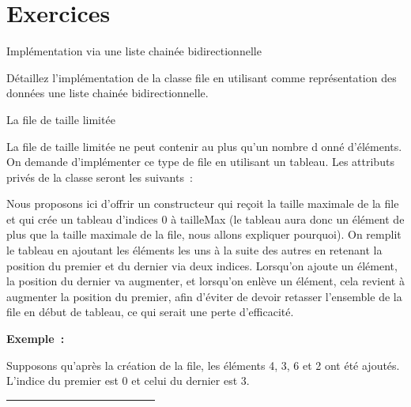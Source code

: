 	
\section{Exercices}

	\begin{Exercice}{Implémentation via une liste chainée bidirectionnelle}
		
		Détaillez l'implémentation de la classe file en utilisant 
		comme représentation des données une liste chainée bidirectionnelle.
	\end{Exercice}

	\begin{Exercice}{La file de taille limitée}
		
		La file de taille limitée ne peut contenir au plus qu'un nombre d
		onné d'éléments. On demande d'implémenter ce type de
		file en utilisant un tableau. Les attributs privés de la 
		classe seront les suivants~:

				
		Nous proposons ici d'offrir un constructeur qui reçoit la 
		taille maximale de la file et qui crée un tableau d'indices 0
		à tailleMax (le tableau aura donc un élément de plus que 
		la taille maximale de la file, nous allons expliquer
		pourquoi). On remplit le tableau en ajoutant les éléments les 
		uns à la suite des autres en retenant la position du
		premier et du dernier via deux indices. Lorsqu'on ajoute un élément, 
		la position du dernier va augmenter, et lorsqu'on
		enlève un élément, cela revient à augmenter la position du premier, 
		afin d'éviter de devoir retasser l'ensemble de la
		file en début de tableau, ce qui serait une perte d'efficacité.

		\textbf{Exemple~:}

		Supposons qu'après la création de la file, les éléments 4, 3, 6 et 2 
		ont été ajoutés. L'indice du premier est 0 et celui du dernier est 3.

		\begin{center}
			\tablefirsthead{}
			\tablehead{}
			\tabletail{}
			\tablelasttail{}
			\begin{supertabular}{|m{1.171cm}|m{1.206cm}|m{1.206cm}|m{1.206cm}|m{1.206cm}|m{1.206cm}|m{1.206cm}|m{1.206cm}|m{1.206cm}|m{1.232cm}|}
			\hline
			 &
			 &
			 &
			 &
			~
			 &
			~
			 &
			~
			 &
			~
			 &
			~
			 &
			~
			\\\hline
			\end{supertabular}
		\end{center}
		

\end{Exercice}
